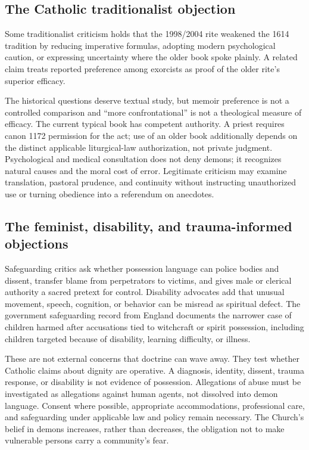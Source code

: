 \subsection{The Catholic traditionalist objection}

Some traditionalist criticism holds that the 1998/2004 rite weakened the
1614 tradition by reducing imperative formulas, adopting modern psychological
caution, or expressing uncertainty where the older book spoke plainly. A
related claim treats reported preference among exorcists as proof of the older
rite's superior efficacy.

The historical questions deserve textual study, but memoir preference is not a
controlled comparison and ``more confrontational'' is not a theological
measure of efficacy. The current typical book has competent authority. A
priest requires canon 1172 permission for the act; use of an older book
additionally depends on the distinct applicable liturgical-law authorization,
not private judgment. Psychological and medical
consultation does not deny demons; it recognizes natural causes and the moral
cost of error. Legitimate criticism may examine translation, pastoral
prudence, and continuity without instructing unauthorized use or turning
obedience into a referendum on anecdotes.

\subsection{The feminist, disability, and trauma-informed objections}

Safeguarding critics ask whether possession language can police bodies and
dissent, transfer
blame from perpetrators to victims, and gives male or clerical authority a
sacred pretext for control. Disability advocates add that unusual movement,
speech, cognition, or behavior can be misread as spiritual defect. The
government safeguarding record from England documents the narrower case of
children harmed after accusations tied to witchcraft or spirit possession,
including children targeted because of disability, learning difficulty, or
illness.

These are not external concerns that doctrine can wave away. They test whether
Catholic claims about dignity are operative. A diagnosis, identity, dissent,
trauma response, or disability is not evidence of possession. Allegations of
abuse must be investigated as allegations against human agents, not dissolved
into demon language. Consent where possible, appropriate accommodations,
professional care, and safeguarding under applicable law and policy remain
necessary. The Church's belief in demons increases,
rather than decreases, the obligation not to make vulnerable persons carry a
community's fear.

